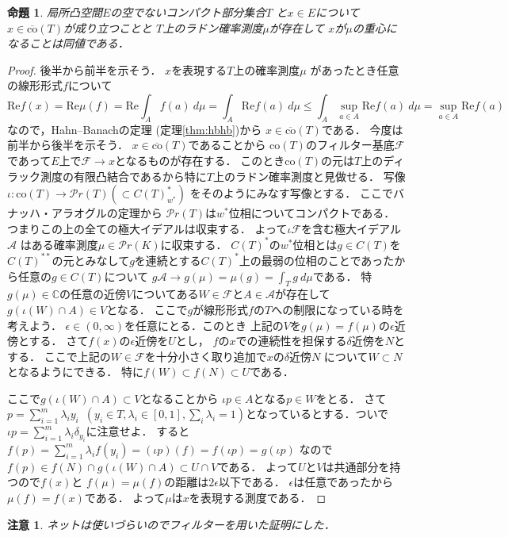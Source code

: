 \documentclass[leqno, a4paper, 12pt]{jsarticle}
\newtheorem{prop}[thm]{命題}
\newtheorem*{rmk}{注意}
\newcommand{\cc}{\mathbb{C}}
\newcommand{\myre}{\mathrm{Re}}
\newcommand{\mycco}[1]{\overline{\mathrm{co}}(#1)}
\newcommand{\myco}[1]{\mathrm{co}(#1)}
\newcommand{\myprob}[1]{\mathcal{P}r(#1)}
\newcommand{\mydirac}[1]{\delta_{#1}}
\begin{document}
\begin{prop}\label{prop:repxco}
局所凸空間$E$の空でないコンパクト部分集合$T$
と$x\in E$について
$x\in \mycco{T}$が成り立つことと
$T$上のラドン確率測度$\mu$が存在して
$x$が$\mu$の重心になることは同値である．
\end{prop}
\begin{proof}
後半から前半を示そう．
$x$を表現する$T$上の確率測度$\mu$
があったとき任意の線形形式$f$について
\[
\myre f(x)=\myre \mu(f)= \myre \int_{A}f(a)\ d\mu
=\int_{A}\myre f(a)\ d\mu\le 
\int_{A}\sup_{a\in A} \myre f(a)\ d\mu=\sup_{a\in A} \myre f(a)
\]
なので，Hahn--Banachの定理
(定理\ref{thm:hbhb})から
$x\in \mycco{T}$である．
今度は前半から後半を示そう．
$x\in \mycco{T}$であることから
$\myco{T}$のフィルター基底$\mathcal{F}$
であって$E$上で$\mathcal{F}\to x$となるものが存在する．
このとき$\myco{T}$の元は$T$上のディラック測度の有限凸結合であるから特に$T$上のラドン確率測度と見做せる．
写像$\iota\colon \myco{T}\to \myprob{T}(\subset C(T)^{*}_{w^{*}})$
をそのようにみなす写像とする．
ここでバナッハ・アラオグルの定理から
$\myprob{T}$は$w^{*}$位相についてコンパクトである．
つまりこの上の全ての極大イデアルは収束する．
よって$\iota\mathcal{F}$を含む極大イデアル$\mathcal{A}$
はある確率測度$\mu\in \myprob{K}$に収束する．
$C(T)^{*}$の$w^{*}$位相とは$g\in C(T)$を$C(T)^{**}$の元とみなして$g$を連続とする$C(T)^{*}$上の最弱の位相のことであったから任意の$g\in C(T)$について
$g\mathcal{A}\to g(\mu)=\mu(g)=\int_{T}g\ d\mu$である．
特$g(\mu)\in \cc$の任意の近傍$V$についてある$W\in \mathcal{F}$と$A\in \mathcal{A}$が存在して
$g(\iota(W)\cap A)\in V$となる．
ここで$g$が線形形式$f$の$T$への制限になっている時を考えよう．
$\epsilon\in (0, \infty)$を任意にとる．このとき
上記の$V$を$g(\mu)=f(\mu)$の$\epsilon$近傍とする．
さて$f(x)$の$\epsilon$近傍を$U$とし，
$f$の$x$での連続性を担保する$\delta$近傍を$N$とする．
ここで上記の$W\in \mathcal{F}$を十分小さく取り追加で$x$の$\delta$近傍$N$
について$W\subset N$となるようにできる．
特に$f(W)\subset f(N)\subset U$である．

ここで$g(\iota(W)\cap A)\subset  V$となることから
$\iota p\in A$となる$p\in W$をとる．
さて
$p=\sum_{i=1}^{m}\lambda_{i}y_{i}$\ $(y_{i}\in T, \lambda_{i}\in [0, 1], \sum_{i}\lambda_{i}=1)$となっているとする．ついで$\iota p=\sum_{i=1}^{m}\lambda_{i}\mydirac{y_{i}}$に注意せよ．
すると
$f(p)=\sum_{i=1}^{m}\lambda_{i}f(y_{i})=
(\iota p)(f)=f(\iota p)=g(\iota p)$
なので
$f(p)\in f(N)\cap g(\iota(W)\cap A)\subset U\cap V$である．
よって$U$と$V$は共通部分を持つので$f(x)$と
$f(\mu)=\mu(f)$の距離は$2\epsilon$以下である．
$\epsilon$は任意であったから
$\mu(f)=f(x)$である．
よって$\mu$は$x$を表現する測度である．
\end{proof}
\begin{rmk}
ネットは使いづらいのでフィルターを用いた証明にした．
\end{rmk}
\end{document}
